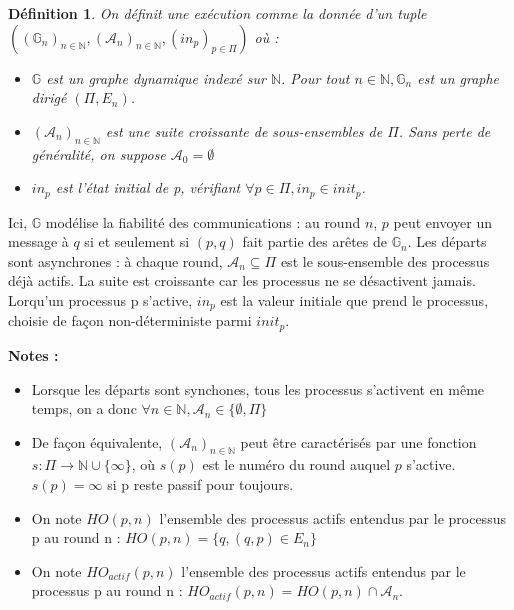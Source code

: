 \documentclass{article}
\newtheorem{definition}{Définition}
\begin{document}
\begin{definition}

On définit une exécution comme la donnée d'un tuple
	$( (\mathds{G}_n)_{n \in \mathds{N}},  (\mathcal{A}_n)_{n \in \mathds{N}}, (in_p)_{p \in \Pi})$ où :

\begin{itemize}

	\item $\mathds{G}$ est un graphe dynamique indexé sur $\mathds{N}$. Pour tout $n \in \mathds{N}, \mathds{G}_n$ est un graphe dirigé $(\Pi, E_n)$. 
	\item $(\mathcal{A}_n)_{n \in \mathds{N}}$ est une suite croissante de sous-ensembles de $\Pi$. Sans perte de généralité, on suppose $\mathcal{A}_0 = \emptyset$
	\item $in_p$ est l'état initial de p, vérifiant $\forall p \in \Pi, in_p \in init_p$.

\end{itemize}
\end{definition}

Ici, $\mathds{G}$ modélise la fiabilité des communications : au round $n$, $p$ peut envoyer un message à $q$ si et seulement si $(p,q)$ fait partie des arêtes de $\mathds{G}_n$.
Les départs sont asynchrones : à chaque round, $\mathcal{A}_n \subseteq \Pi$ est le sous-ensemble des processus déjà actifs. La suite est croissante car les processus ne se désactivent jamais.
Lorqu'un processus p s'active, $in_p$ est la valeur initiale que prend le processus, choisie de façon non-déterministe parmi $init_p$.

\textbf{Notes :}
\begin{itemize}

	\item Lorsque les départs sont synchones, tous les processus s'activent en même temps, on a donc $\forall n \in \mathds{N}, \mathcal{A}_n \in \{\emptyset, \Pi\}$
	\item De façon équivalente, $(\mathcal{A}_n)_{n \in \mathds{N}}$ peut être caractérisés par une fonction $s : \Pi \rightarrow \mathds{N} \cup \{\infty\}$,
		où $s(p)$ est le numéro du round auquel $p$ s'active. $s(p) = \infty$ si p reste passif pour toujours.
	\item On note $HO(p,n)$ l'ensemble des processus actifs entendus par le processus p au round n : $HO(p,n) = \{q, (q,p) \in E_n\}$
	\item On note $HO_{actif}(p,n)$ l'ensemble des processus actifs entendus par le processus p au round n : $HO_{actif}(p,n) = HO(p,n) \cap \mathcal{A}_n$.

\end{itemize}
\end{document}
